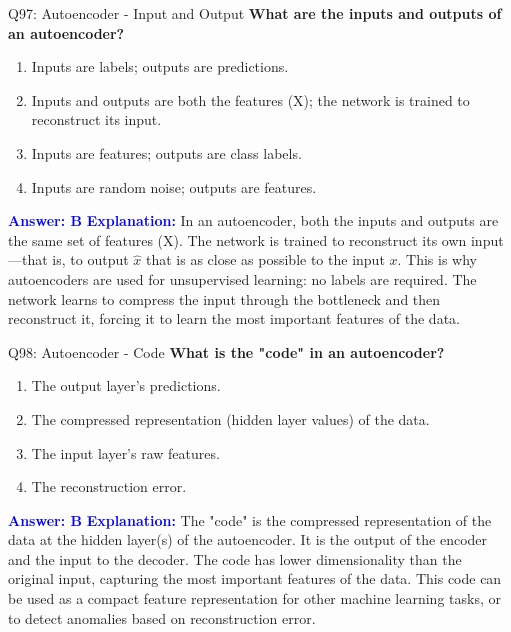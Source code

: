 \documentclass[8pt]{beamer}
\begin{document}
	\begin{frame}{Q97: Autoencoder - Input and Output}
		\fontsize{6.5}{7.5}\selectfont
		\textbf{What are the inputs and outputs of an autoencoder?}
		\begin{enumerate}
			\item Inputs are labels; outputs are predictions.
			\item Inputs and outputs are both the features (X); the network is trained to reconstruct its input.
			\item Inputs are features; outputs are class labels.
			\item Inputs are random noise; outputs are features.
		\end{enumerate}
		\vspace{0.1cm}
		\textcolor{blue}{\textbf{Answer: B}}
		\vspace{0.1cm}
		\textcolor{blue}{\textbf{Explanation:}} In an autoencoder, both the inputs and outputs are the same set of features (X). The network is trained to reconstruct its own input—that is, to output $\hat{x}$ that is as close as possible to the input $x$. This is why autoencoders are used for unsupervised learning: no labels are required. The network learns to compress the input through the bottleneck and then reconstruct it, forcing it to learn the most important features of the data.
	\end{frame}
	
	\begin{frame}{Q98: Autoencoder - Code}
		\fontsize{6.5}{7.5}\selectfont
		\textbf{What is the "code" in an autoencoder?}
		\begin{enumerate}
			\item The output layer's predictions.
			\item The compressed representation (hidden layer values) of the data.
			\item The input layer's raw features.
			\item The reconstruction error.
		\end{enumerate}
		\vspace{0.1cm}
		\textcolor{blue}{\textbf{Answer: B}}
		\vspace{0.1cm}
		\textcolor{blue}{\textbf{Explanation:}} The "code" is the compressed representation of the data at the hidden layer(s) of the autoencoder. It is the output of the encoder and the input to the decoder. The code has lower dimensionality than the original input, capturing the most important features of the data. This code can be used as a compact feature representation for other machine learning tasks, or to detect anomalies based on reconstruction error.
	\end{frame}
	
\end{document}
